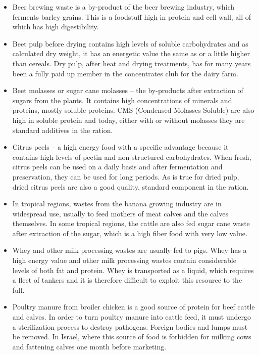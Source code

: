 \documentclass[]{book}
\begin{document}
\begin{itemize}
\item
  Beer brewing waste is a by-product of the beer brewing industry, which
  ferments barley grains. This is a foodstuff high in protein and cell
  wall, all of which has high digestibility.
\item
  Beet pulp before drying contains high levels of soluble carbohydrates
  and as calculated dry weight, it has an energetic value the same as or
  a little higher than cereals. Dry pulp, after heat and drying
  treatments, has for many years been a fully paid up member in the
  concentrates club for the dairy farm.
\item
  Beet molasses or sugar cane molasses -- the by-products after
  extraction of sugars from the plants. It contains high concentrations
  of minerals and proteins, mostly soluble proteins. CMS (Condensed
  Molasses Soluble) are also high in soluble protein and today, either
  with or without molasses they are standard additives in the ration.
\item
  Citrus peels -- a high energy food with a specific advantage because
  it contains high levels of pectin and non-structured carbohydrates.
  When fresh, citrus peels can be used on a daily basis and after
  fermentation and preservation, they can be used for long periods. As
  is true for dried pulp, dried citrus peels are also a good quality,
  standard component in the ration.
\item
  In tropical regions, wastes from the banana growing industry are in
  widespread use, usually to feed mothers of meat calves and the calves
  themselves. In some tropical regions, the cattle are also fed sugar
  cane waste after extraction of the sugar, which is a high fiber food
  with very low value.
\item
  Whey and other milk processing wastes are usually fed to pigs. Whey
  has a high energy value and other milk processing wastes contain
  considerable levels of both fat and protein. Whey is transported as a
  liquid, which requires a fleet of tankers and it is therefore
  difficult to exploit this resource to the full.
\item
  Poultry manure from broiler chicken is a good source of protein for
  beef cattle and calves. In order to turn poultry manure into cattle
  feed, it must undergo a sterilization process to destroy pathogens.
  Foreign bodies and lumps must be removed. In Israel, where this source
  of food is forbidden for milking cows and fattening calves one month
  before marketing.

\end{itemize}
\end{document}
